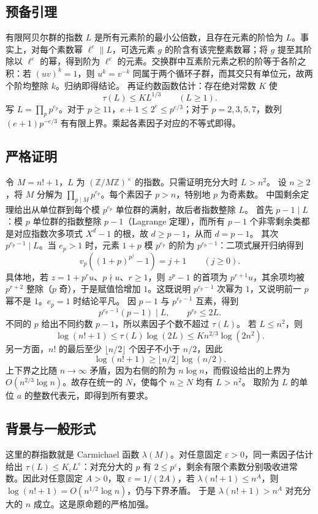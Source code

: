 \documentclass[UTF8,11pt,a4paper,fontset=fandol]{ctexart}
\newcommand{\Z}{\mathbb Z}
\begin{document}
\subsection*{预备引理}
有限阿贝尔群的指数 $L$ 是所有元素阶的最小公倍数，且存在元素的阶恰为 $L$。事实上，对每个素数幂 $\ell^e\parallel L$，可选元素 $g$ 的阶含有该完整素数幂；将 $g$ 提至其阶除以 $\ell^e$ 的幂，得到阶为 $\ell^e$ 的元素。交换群中互素阶元素之积的阶等于各阶之积：若 $(uv)^k=1$，则 $u^k=v^{-k}$ 同属于两个循环子群，而其交只有单位元，故两个阶均整除 $k$。归纳即得结论。
再证约数函数估计：存在绝对常数 $K$ 使
\[
\tau(L)\le K L^{1/3}\qquad(L\ge1).
\]
写 $L=\prod_p p^{e_p}$。对于 $p\ge 11$，$e+1\le2^e\le p^{e/3}$；对于 $p=2,3,5,7$，数列 $(e+1)p^{-e/3}$ 有有限上界。乘起各素因子对应的不等式即得。
\subsection*{严格证明}
令 $M=n!+1$，$L$ 为 $(\Z/M\Z)^\times$ 的指数。只需证明充分大时 $L>n^2$。
设 $n\ge2$，将 $M$ 分解为 $\prod_{p\mid M}p^{e_p}$。每个素因子 $p>n$，特别地 $p$ 为奇素数。
中国剩余定理给出从单位群到每个模 $p^{e_p}$ 单位群的满射，故后者指数整除 $L$。
首先 $p-1\mid L$：模 $p$ 单位群的指数整除 $p-1$（Lagrange 定理），而所有 $p-1$ 个非零剩余类都是对应指数次多项式 $X^d-1$ 的根，故 $d\ge p-1$，从而 $d=p-1$。
其次 $p^{e_p-1}\mid L$。当 $e_p>1$ 时，元素 $1+p$ 模 $p^{e_p}$ 的阶为 $p^{e_p-1}$：二项式展开归纳得到
\[
v_p((1+p)^{p^j}-1)=j+1\qquad(j\ge0).
\]
具体地，若 $z=1+p^r u$、$p\nmid u$、$r\ge1$，则 $z^p-1$ 的首项为 $p^{r+1}u$，其余项均被 $p^{r+2}$ 整除（$p$ 奇），于是赋值恰增加 $1$。这既说明 $p^{e_p-1}$ 次幂为 $1$，又说明前一 $p$ 幂不是 $1$。$e_p=1$ 时结论平凡。
因 $p-1$ 与 $p^{e_p-1}$ 互素，得到
\[
p^{e_p-1}(p-1)\mid L,\qquad p^{e_p}\le2L.
\]
不同的 $p$ 给出不同约数 $p-1$，所以素因子个数不超过 $\tau(L)$。
若 $L\le n^2$，则
\[
\log(n!+1)\le\tau(L)\log(2L)
\le K n^{2/3}\log(2n^2).
\]
另一方面，$n!$ 的最后至少 $\lfloor n/2\rfloor$ 个因子不小于 $n/2$，因此
\[
\log(n!+1)\ge\lfloor n/2\rfloor\log(n/2).
\]
上下界之比随 $n\to\infty$ 矛盾，因为右侧的阶为 $n\log n$，而假设给出的上界为 $O(n^{2/3}\log n)$。故存在统一的 $N$，使每个 $n\ge N$ 均有 $L>n^2$。
取阶为 $L$ 的单位 $a$ 的整数代表元，即得到所有要求。
\subsection*{背景与一般形式}
这里的群指数就是 Carmichael 函数 $\lambda(M)$。对任意固定 $\varepsilon>0$，同一素因子估计给出 $\tau(L)\le K_\varepsilon L^\varepsilon$：对充分大的 $p$ 有 $2\le p^\varepsilon$，剩余有限个素数分别吸收进常数。因此对任意固定 $A>0$，取 $\varepsilon=1/(2A)$，若 $\lambda(n!+1)\le n^A$，则
$\log(n!+1)=O(n^{1/2}\log n)$，仍与下界矛盾。
于是 $\lambda(n!+1)>n^A$ 对充分大的 $n$ 成立。这是原命题的严格加强。
\end{document}
